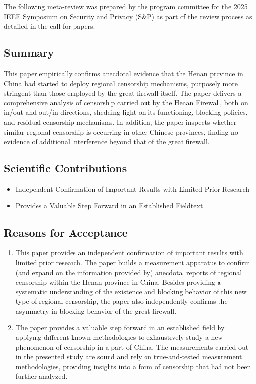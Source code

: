 \documentclass[conference,compsoc]{IEEEtran}
\begin{document}
The following meta-review was prepared by the program committee for the 2025
IEEE Symposium on Security and Privacy (S\&P) as part of the review process as
detailed in the call for papers.

\subsection{Summary}

This paper empirically confirms anecdotal evidence that the Henan province in China had started to deploy regional censorship mechanisms, purposely more stringent than those employed by the great firewall itself. The paper delivers a comprehensive analysis of censorship carried out by the Henan Firewall, both on in/out and out/in directions, shedding light on its functioning, blocking policies, and residual censorship mechanisms. In addition, the paper inspects whether similar regional censorship is occurring in other Chinese provinces, finding no evidence of additional interference beyond that of the great firewall.

\subsection{Scientific Contributions}


\begin{itemize}
\item Independent Confirmation of Important Results with Limited Prior Research
\item Provides a Valuable Step Forward in an Established Fieldtext
\end{itemize}

\subsection{Reasons for Acceptance}
\begin{enumerate}
\item This paper provides an independent confirmation of important results with limited prior research.  The paper builds a measurement apparatus to confirm (and expand on the information provided by) anecdotal reports of regional censorship within the Henan province in China. Besides providing a systematic understanding of the existence and blocking behavior of this new type of regional censorship, the paper also independently confirms the asymmetry in blocking behavior of the great firewall.
\item The paper provides a valuable step forward in an established field by applying different known methodologies to exhaustively study a new phenomenon of censorship in a part of China. The measurements carried out in the presented study are sound and rely on true-and-tested measurement methodologies, providing insights into a form of censorship that had not been further analyzed.
\end{enumerate}
\end{document}
